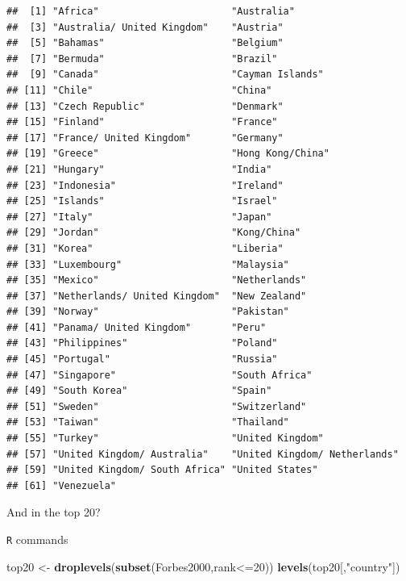\documentclass[]{article}
\newenvironment{Shaded}{\begin{snugshade}}{\end{snugshade}}
\newcommand{\KeywordTok}[1]{\textcolor[rgb]{0.13,0.29,0.53}{\textbf{{#1}}}}
\newcommand{\DecValTok}[1]{\textcolor[rgb]{0.00,0.00,0.81}{{#1}}}
\newcommand{\StringTok}[1]{\textcolor[rgb]{0.31,0.60,0.02}{{#1}}}
\newcommand{\NormalTok}[1]{{#1}}
\numberwithin{equation}{section}
\begin{document}
\begin{verbatim}
##  [1] "Africa"                       "Australia"                   
##  [3] "Australia/ United Kingdom"    "Austria"                     
##  [5] "Bahamas"                      "Belgium"                     
##  [7] "Bermuda"                      "Brazil"                      
##  [9] "Canada"                       "Cayman Islands"              
## [11] "Chile"                        "China"                       
## [13] "Czech Republic"               "Denmark"                     
## [15] "Finland"                      "France"                      
## [17] "France/ United Kingdom"       "Germany"                     
## [19] "Greece"                       "Hong Kong/China"             
## [21] "Hungary"                      "India"                       
## [23] "Indonesia"                    "Ireland"                     
## [25] "Islands"                      "Israel"                      
## [27] "Italy"                        "Japan"                       
## [29] "Jordan"                       "Kong/China"                  
## [31] "Korea"                        "Liberia"                     
## [33] "Luxembourg"                   "Malaysia"                    
## [35] "Mexico"                       "Netherlands"                 
## [37] "Netherlands/ United Kingdom"  "New Zealand"                 
## [39] "Norway"                       "Pakistan"                    
## [41] "Panama/ United Kingdom"       "Peru"                        
## [43] "Philippines"                  "Poland"                      
## [45] "Portugal"                     "Russia"                      
## [47] "Singapore"                    "South Africa"                
## [49] "South Korea"                  "Spain"                       
## [51] "Sweden"                       "Switzerland"                 
## [53] "Taiwan"                       "Thailand"                    
## [55] "Turkey"                       "United Kingdom"              
## [57] "United Kingdom/ Australia"    "United Kingdom/ Netherlands" 
## [59] "United Kingdom/ South Africa" "United States"               
## [61] "Venezuela"
\end{verbatim}

And in the top 20?

\texttt{R} commands

\begin{Shaded}
\begin{Highlighting}[]
\NormalTok{top20 <-}\StringTok{ }\KeywordTok{droplevels}\NormalTok{(}\KeywordTok{subset}\NormalTok{(Forbes2000,rank<=}\DecValTok{20}\NormalTok{))}
\KeywordTok{levels}\NormalTok{(top20[,}\StringTok{"country"}\NormalTok{])}
\end{Highlighting}
\end{Shaded}
\end{document}
